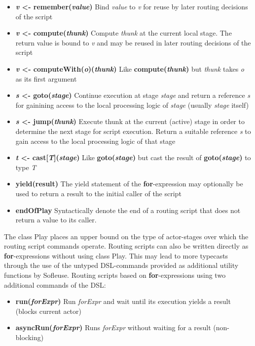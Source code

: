 \documentclass{sig-alternate}
\begin{document}
\begin{itemize}                                   
	\item \textbf{\emph{v} <- remember(\emph{value})} Bind \emph{value} to \emph{v} for reuse by
	later routing decisions of the script
	\item \textbf{\emph{v} <- compute(\emph{thunk})} Compute \emph{thunk} at the current local stage.  
	The return value is bound to \emph{v} and may be reused in later routing decisions of the script
	\item \textbf{\emph{v} <- computeWith(\emph{o})(\emph{thunk})} Like \textbf{compute(\emph{thunk})} 
	but \emph{thunk} takes \emph{o} as its first argument
	\item \textbf{\emph{s} <- goto(\emph{stage})} Continue execution at stage \emph{stage} and 
	return a reference \emph{s} for gainining access to the local processing logic of \emph{stage} 
	(usually \emph{stage} itself)
	\item \textbf{\emph{s} <- jump(\emph{thunk})} Execute thunk at the current (active) stage in 
	order to determine the next stage for script execution.	Return a suitable reference \emph{s} to 
	gain access to the local processing logic of that stage
	\item \textbf{\emph{t} <- cast[\emph{T}](\emph{stage})} Like \textbf{goto(\emph{stage})} but 
	cast the result of \textbf{goto(\emph{stage})} to type \emph{T}   
	\item \textbf{yield(result)} The yield statement of the \textbf{for}-expression may optionally be used to 
	return a result to the initial caller of the script                           	
	\item \textbf{endOfPlay} Syntactically denote the end of a routing script that does not return
	 a value to its caller.
\end{itemize}


The class Play places an upper bound on the type of actor-stages over which the routing script
commands operate. Routing scripts can also be written directly as \textbf{for}-expressions without
using class Play. This may lead to more typecasts through the use of the untyped DSL-commands
provided as additional utility functions by Sofleuse. Routing scripts based on
\textbf{for}-expressions using two additional commands of the DSL:

\begin{itemize}
    \item \textbf{run(\emph{forExpr})} Run \emph{forExpr} and wait until its execution yields a result (blocks current actor)
	\item \textbf{asyncRun(\emph{forExpr})} Runs \emph{forExpr} without waiting for a result (non-blocking)
\end{itemize}	
\end{document}

